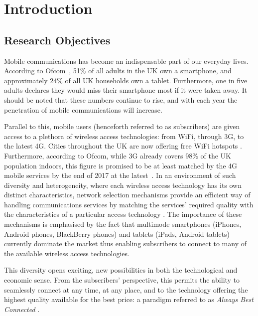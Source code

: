 \chapter{Introduction} %
\label{cha:introduction}

\section{Research Objectives} %
\label{sec:research_objectives_introduction}
Mobile communications has become an indispensable part of our everyday lives. According to Ofcom~\cite{OfcomReport2013}, 51\% of all adults in the UK own a smartphone, and approximately 24\% of all UK households own a tablet. Furthermore, one in five adults declares they would miss their smartphone most if it were taken away. It should be noted that these numbers continue to rise, and with each year the penetration of mobile communications will increase.

Parallel to this, mobile users (henceforth referred to as subscribers) are given access to a plethora of wireless access technologies: from WiFi, through 3G, to the latest 4G. Cities throughout the UK are now offering free WiFi hotspots \cite{BBCWiFiGlasgow2014}. Furthermore, according to Ofcom, while 3G already covers 98\% of the UK population indoors, this figure is promised to be at least matched by the 4G mobile services by the end of 2017 at the latest~\cite{OfcomLTE2013}. In an environment of such diversity and heterogeneity, where each wireless access technology has its own distinct characteristics, network selection mechanisms provide an efficient way of handling communications services by matching the services' required quality with the characteristics of a particular access technology \cite{HossainBeaubrun09}. The importance of these mechanisms is emphasised by the fact that multimode smartphones (iPhones, Android phones, BlackBerry phones) and tablets (iPads, Android tablets) currently dominate the market thus enabling subscribers to connect to many of the available wireless access technologies.

This diversity opens exciting, new possibilities in both the technological and economic sense.  From the subscribers' perspective, this permits the ability to seamlessly connect at any time, at any place, and to the technology offering the highest quality available for the best price: a paradigm referred to as \emph{Always Best Connected} \cite{ABC03}. 

